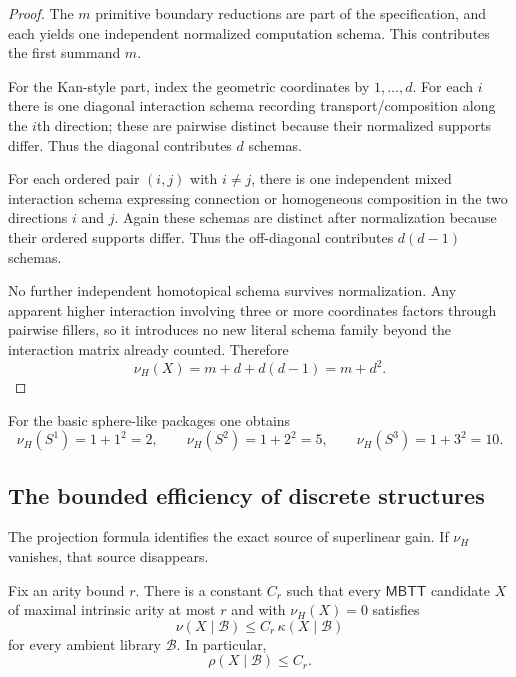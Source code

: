 \documentclass{lmcs}
\newcommand{\B}{\mathcal{B}}
\newcommand{\MBTT}{\mathsf{MBTT}}
\begin{document}
\begin{proof}
The $m$ primitive boundary reductions are part of the specification, and each yields one independent normalized computation schema. This contributes the first summand $m$.

For the Kan-style part, index the geometric coordinates by $1,\dots,d$. For each $i$ there is one diagonal interaction schema recording transport/composition along the $i$th direction; these are pairwise distinct because their normalized supports differ. Thus the diagonal contributes $d$ schemas.

For each ordered pair $(i,j)$ with $i \neq j$, there is one independent mixed interaction schema expressing connection or homogeneous composition in the two directions $i$ and $j$. Again these schemas are distinct after normalization because their ordered supports differ. Thus the off-diagonal contributes $d(d-1)$ schemas.

No further independent homotopical schema survives normalization. Any apparent higher interaction involving three or more coordinates factors through pairwise fillers, so it introduces no new literal schema family beyond the interaction matrix already counted. Therefore
\[
  \nu_H(X) = m + d + d(d-1) = m + d^2.
\]
\end{proof}

\begin{cor}
\label{cor:spheres}
For the basic sphere-like packages one obtains
\[
  \nu_H(S^1) = 1+1^2 = 2,
  \qquad
  \nu_H(S^2) = 1+2^2 = 5,
  \qquad
  \nu_H(S^3) = 1+3^2 = 10.
\]
\end{cor}

\subsection{The bounded efficiency of discrete structures}

The projection formula identifies the exact source of superlinear gain. If $\nu_H$ vanishes, that source disappears.

\begin{lem}
\label{lem:discrete-bound}
Fix an arity bound $r$. There is a constant $C_r$ such that every $\MBTT$ candidate $X$ of maximal intrinsic arity at most $r$ and with $\nu_H(X)=0$ satisfies
\[
  \nu(X\mid\B) \leq C_r\,\kappa(X\mid\B)
\]
for every ambient library $\B$. In particular,
\[
  \rho(X\mid\B) \leq C_r.
\]
\end{lem}
\end{document}
